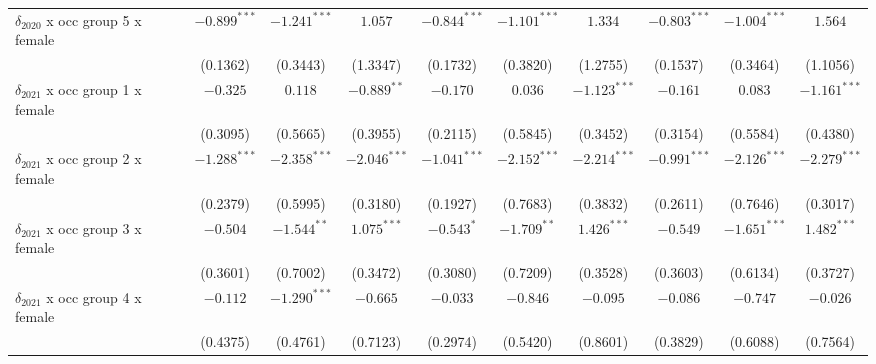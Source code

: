\begin{tabular}{l|ccc|ccc|ccc}
$\delta_{2020}$ x occ group 5 x female &          $-0.899^{***}$ &  $-1.241^{***}$ &         $1.057$ &           $-0.844^{***}$ &  $-1.101^{***}$ &         $1.334$ &           $-0.803^{***}$ &  $-1.004^{***}$ &         $1.564$ \\
                                       &                (0.1362) &        (0.3443) &        (1.3347) &                 (0.1732) &        (0.3820) &        (1.2755) &                 (0.1537) &        (0.3464) &        (1.1056) \\
$\delta_{2021}$ x occ group 1 x female &                $-0.325$ &         $0.118$ &   $-0.889^{**}$ &                 $-0.170$ &         $0.036$ &  $-1.123^{***}$ &                 $-0.161$ &         $0.083$ &  $-1.161^{***}$ \\
                                       &                (0.3095) &        (0.5665) &        (0.3955) &                 (0.2115) &        (0.5845) &        (0.3452) &                 (0.3154) &        (0.5584) &        (0.4380) \\
$\delta_{2021}$ x occ group 2 x female &          $-1.288^{***}$ &  $-2.358^{***}$ &  $-2.046^{***}$ &           $-1.041^{***}$ &  $-2.152^{***}$ &  $-2.214^{***}$ &           $-0.991^{***}$ &  $-2.126^{***}$ &  $-2.279^{***}$ \\
                                       &                (0.2379) &        (0.5995) &        (0.3180) &                 (0.1927) &        (0.7683) &        (0.3832) &                 (0.2611) &        (0.7646) &        (0.3017) \\
$\delta_{2021}$ x occ group 3 x female &                $-0.504$ &   $-1.544^{**}$ &   $1.075^{***}$ &               $-0.543^*$ &   $-1.709^{**}$ &   $1.426^{***}$ &                 $-0.549$ &  $-1.651^{***}$ &   $1.482^{***}$ \\
                                       &                (0.3601) &        (0.7002) &        (0.3472) &                 (0.3080) &        (0.7209) &        (0.3528) &                 (0.3603) &        (0.6134) &        (0.3727) \\
$\delta_{2021}$ x occ group 4 x female &                $-0.112$ &  $-1.290^{***}$ &        $-0.665$ &                 $-0.033$ &        $-0.846$ &        $-0.095$ &                 $-0.086$ &        $-0.747$ &        $-0.026$ \\
                                       &                (0.4375) &        (0.4761) &        (0.7123) &                 (0.2974) &        (0.5420) &        (0.8601) &                 (0.3829) &        (0.6088) &        (0.7564) \\

\end{tabular}

